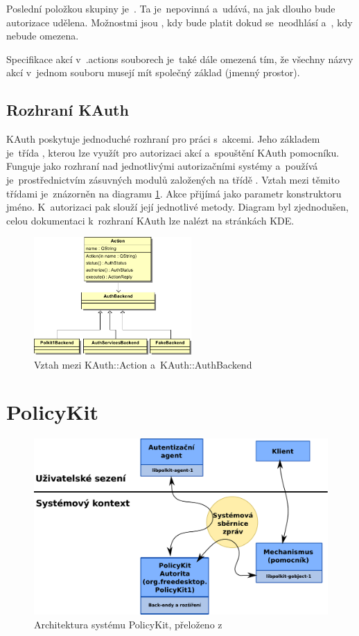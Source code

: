 Poslední položkou skupiny je~. Ta je~nepovinná a~udává, na jak dlouho bude autorizace udělena. Možnostmi jsou , kdy bude platit dokud se~neodhlásí a~, kdy nebude omezena.

Specifikace akcí v~.actions souborech je~také dále omezená tím, že všechny názvy akcí v~jednom souboru musejí mít společný základ (jmenný prostor).

\subsection*{Rozhraní KAuth}
KAuth poskytuje jednoduché rozhraní pro práci s~akcemi. Jeho základem je~třída , kterou lze využít pro autorizaci akcí a~spouštění KAuth pomocníku. Funguje jako rozhraní nad jednotlivými autorizačními systémy a~používá je~prostřednictvím zásuvných modulů založených na třídě . Vztah mezi těmito třídami je~znázorněn na diagramu \ref{fig:KAuthDiag}. Akce přijímá jako parametr konstruktoru jméno. K~autorizaci pak slouží její jednotlivé metody. Diagram byl zjednodušen, celou dokumentaci k~rozhraní KAuth lze nalézt na stránkách KDE.\cite{KAuthusage, KAuthAPI}


\begin{figure}[h]
    \centering
    \includegraphics[width=6cm]{obrazky/KAuthAction.pdf}
    \caption{Vztah mezi KAuth::Action a~KAuth::AuthBackend}
    \label{fig:KAuthDiag}
\end{figure}

\section{PolicyKit}
\begin{figure}[h]
    \centering
    \includegraphics[width=12cm]{obrazky/polkit-architecture-vector-cz.pdf}
    \caption{Architektura systému PolicyKit, přeloženo z~\cite{manpolkit1}}
    \label{fig:polkit_arch}
\end{figure}

